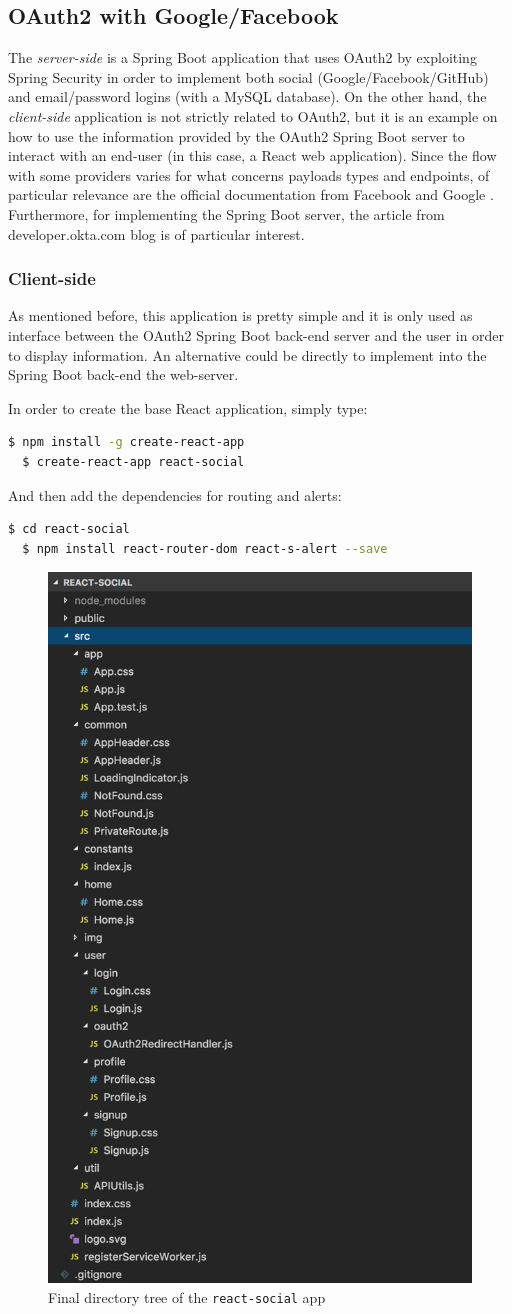 \subsection{OAuth2 with Google/Facebook}
The \textit{server-side} is a Spring Boot application that uses OAuth2 by exploiting Spring Security in order to implement both social (Google/Facebook/GitHub) and email/password logins (with a MySQL database). On the other hand, the \textit{client-side} application is not strictly related to OAuth2, but it is an example on how to use the information provided by the OAuth2 Spring Boot server to interact with an end-user (in this case, a React web application). Since the flow with some providers varies for what concerns payloads types and endpoints, of particular relevance are the official documentation from Facebook \cite{facebook} and Google \cite{google1, google2}. Furthermore, for implementing the Spring Boot server, the article from developer.okta.com blog \cite{sprboot} is of particular interest.

\subsubsection{Client-side}
As mentioned before, this application is pretty simple and it is only used as interface between the OAuth2 Spring Boot back-end server and the user in order to display information. An alternative could be directly to implement into the Spring Boot back-end the web-server.

\noindent In order to create the base React application, simply type:
\begin{lstlisting}[language=bash]
  $ npm install -g create-react-app
  $ create-react-app react-social
\end{lstlisting}

\noindent And then add the dependencies for routing and alerts:
\begin{lstlisting}[language=bash]
  $ cd react-social
  $ npm install react-router-dom react-s-alert --save
\end{lstlisting}



\begin{figure}
  \begin{center}
    \includegraphics[width=0.31 \textwidth]{chapters/images/chp6/dirreact.jpg}
  \end{center}
  \caption{Final directory tree of the \texttt{react-social} app}
  \label{fig:dirtree}
\end{figure}

